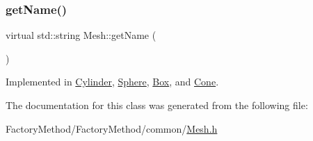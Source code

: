 \subsubsection{\texorpdfstring{getName()}{getName()}}
{\footnotesize\ttfamily virtual std\+::string Mesh\+::get\+Name (\begin{DoxyParamCaption}{ }\end{DoxyParamCaption})\hspace{0.3cm}{\ttfamily [pure virtual]}}



Implemented in \mbox{\hyperlink{class_cylinder_afdb7f76b3f02471d638c36127395d181}{Cylinder}}, \mbox{\hyperlink{class_sphere_a173e667086ecd8b9d972e1d6f9885d9d}{Sphere}}, \mbox{\hyperlink{class_box_ac8792393d053c6cac65a36e5c1f27f15}{Box}}, and \mbox{\hyperlink{class_cone_a9581010134e3d1fe079fe5cce1933786}{Cone}}.



The documentation for this class was generated from the following file\+:\begin{DoxyCompactItemize}
\item 
Factory\+Method/\+Factory\+Method/common/\mbox{\hyperlink{_mesh_8h}{Mesh.\+h}}\end{DoxyCompactItemize}
